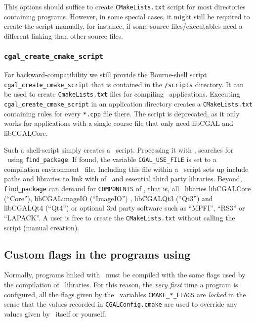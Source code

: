 This options should suffice to create \texttt{CMakeLists.txt} script
for most directories containing programs. However, in some special
cases, it might still be required to create the script manually, for
instance, if some source files/executables need a different linking than
other source files. 

\begin{ccDeprecated}
\subsubsection{\texttt{cgal\_create\_cmake\_script\label{sec:create_cgal_cmake_script}}}

For backward-compatibility we still provide the 
Bourne-shell script \texttt{cgal\_create\_cmake\_script} that 
is contained in the
\texttt{\cgalrel/scripts} directory. It can be used to create
\texttt{CmakeLists.txt} files for compiling \cgal\ applications. Executing
\texttt{cgal\_create\_cmake\_script} in an application directory creates a
\texttt{CMakeLists.txt} containing rules for every \texttt{*.cpp} file
there. The script is deprecated, as it only works for applications 
with a single course file that only need libCGAL and libCGALCore.
\end{ccDeprecated}

Such a shell-script simply creates a \cmake\ script. Processing it
with \cmnke, searches for \cgal\ using \texttt{find\_package}. If found,
the variable \texttt{CGAL\_USE\_FILE} is set to a compilation environment \cmake\ file. Including
this file within a \cmake\ script sets up include paths and libraries to
link with of \cgal\ and essential third party libraries. Beyond,
\texttt{find\_package} can demand for \texttt{COMPONENTS} of \cgal,
that is, all \cgal\ libaries libCGALCore (``Core''),
libCGALimageIO (``ImageIO'') , libCGALQt3 (``Qt3'') and libCGALQt4
(``Qt4'') or optional 3rd party software such as ``MPFI'', ``RS3'' or
``LAPACK''. A user is free to create the \texttt{CMakeLists.txt}
without calling the script (manual creation).


\subsection{Custom flags in the programs using \cgal}

Normally, programs linked with \cgal\ must be compiled with the same flags
used by the compilation of \cgal\
libraries. For this reason, the \emph{very first} time
a program is configured, all the flags given by the \cmake\ variables \texttt{CMAKE\_*\_FLAGS}
are \emph{locked} in the sense that the values recorded in \texttt{CGALConfig.cmake} 
are used to override any values given by \cmake\ itself or yourself.

